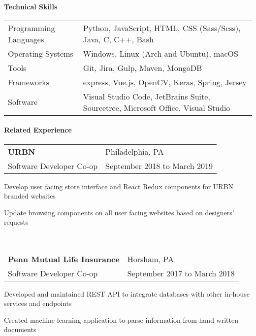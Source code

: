 \documentclass[10pt,]{article}
\let\oldparagraph\paragraph
\renewcommand{\paragraph}[1]{\oldparagraph{#1}\mbox{}}
\begin{document}
\hypertarget{technical-skills}{%
\paragraph{Technical Skills}\label{technical-skills}}

\begin{tabular}{l | l}
    Programming Languages & Python, JavaScript, HTML, CSS (Sass/Scss), Java, C, C++, Bash\\
    Operating Systems     & Windows, Linux (Arch and Ubuntu), macOS\\
    Tools             & Git, Jira, Gulp, Maven, MongoDB\\
    Frameworks        & express, Vue.js, OpenCV, Keras, Spring, Jersey\\
    Software          & Visual Studio Code, JetBrains Suite, Sourcetree, Microsoft Office, Visual Studio
\end{tabular}

\hypertarget{related-experience}{%
\paragraph{Related Experience}\label{related-experience}}

\begin{tabularx}{\textwidth}{l X}
    \textbf{URBN} & \hfill Philadelphia, PA\\
    Software Developer Co-op        & \hfill September 2018 to March 2019
\end{tabularx}

\begin{list}{\quad}{}
    \item Develop user facing store interface and React Redux components for URBN branded websites
    \item Update browsing components on all user facing websites based on designers' requests
\end{list}

~

\begin{tabularx}{\textwidth}{l X}
    \textbf{Penn Mutual Life Insurance} & \hfill Horsham, PA\\
    Software Developer Co-op        & \hfill September 2017 to March 2018
\end{tabularx}

\begin{list}{\quad}{}
    \item Developed and maintained REST API to integrate databases with other in-house services and endpoints
    \item Created machine learning application to parse information from hand written documents
\end{list}
\end{document}

